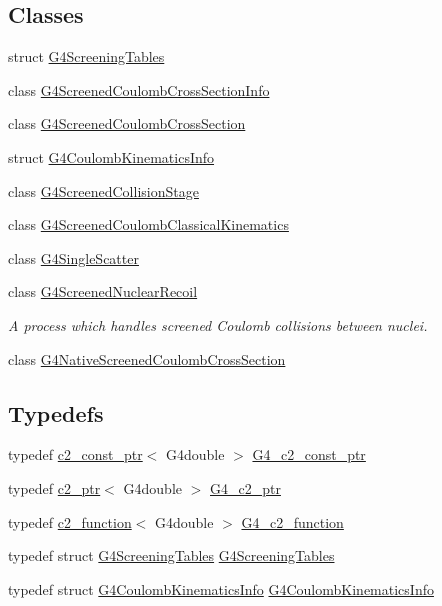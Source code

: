 \subsection*{Classes}
\begin{DoxyCompactItemize}
\item 
struct \hyperlink{structG4ScreeningTables}{G4\+Screening\+Tables}
\item 
class \hyperlink{classG4ScreenedCoulombCrossSectionInfo}{G4\+Screened\+Coulomb\+Cross\+Section\+Info}
\item 
class \hyperlink{classG4ScreenedCoulombCrossSection}{G4\+Screened\+Coulomb\+Cross\+Section}
\item 
struct \hyperlink{structG4CoulombKinematicsInfo}{G4\+Coulomb\+Kinematics\+Info}
\item 
class \hyperlink{classG4ScreenedCollisionStage}{G4\+Screened\+Collision\+Stage}
\item 
class \hyperlink{classG4ScreenedCoulombClassicalKinematics}{G4\+Screened\+Coulomb\+Classical\+Kinematics}
\item 
class \hyperlink{classG4SingleScatter}{G4\+Single\+Scatter}
\item 
class \hyperlink{classG4ScreenedNuclearRecoil}{G4\+Screened\+Nuclear\+Recoil}
\begin{DoxyCompactList}\small\item\em A process which handles screened Coulomb collisions between nuclei. \end{DoxyCompactList}\item 
class \hyperlink{classG4NativeScreenedCoulombCrossSection}{G4\+Native\+Screened\+Coulomb\+Cross\+Section}
\end{DoxyCompactItemize}
\subsection*{Typedefs}
\begin{DoxyCompactItemize}
\item 
typedef \hyperlink{classc2__const__ptr}{c2\+\_\+const\+\_\+ptr}$<$ G4double $>$ \hyperlink{G4ScreenedNuclearRecoil_8hh_a1252ac0bd90119ed9cc3298296b77c2a}{G4\+\_\+c2\+\_\+const\+\_\+ptr}
\item 
typedef \hyperlink{classc2__ptr}{c2\+\_\+ptr}$<$ G4double $>$ \hyperlink{G4ScreenedNuclearRecoil_8hh_a54f93f48440e736bf99cf574ecf80385}{G4\+\_\+c2\+\_\+ptr}
\item 
typedef \hyperlink{classc2__function}{c2\+\_\+function}$<$ G4double $>$ \hyperlink{G4ScreenedNuclearRecoil_8hh_a679aa602c6cfde1625601e0314b3cc01}{G4\+\_\+c2\+\_\+function}
\item 
typedef struct \hyperlink{structG4ScreeningTables}{G4\+Screening\+Tables} \hyperlink{G4ScreenedNuclearRecoil_8hh_a666b683a8ba6d3adac86c945213451df}{G4\+Screening\+Tables}
\item 
typedef struct \hyperlink{structG4CoulombKinematicsInfo}{G4\+Coulomb\+Kinematics\+Info} \hyperlink{G4ScreenedNuclearRecoil_8hh_abcbdcc66cc22345eafcf940632ea37bc}{G4\+Coulomb\+Kinematics\+Info}
\end{DoxyCompactItemize}

